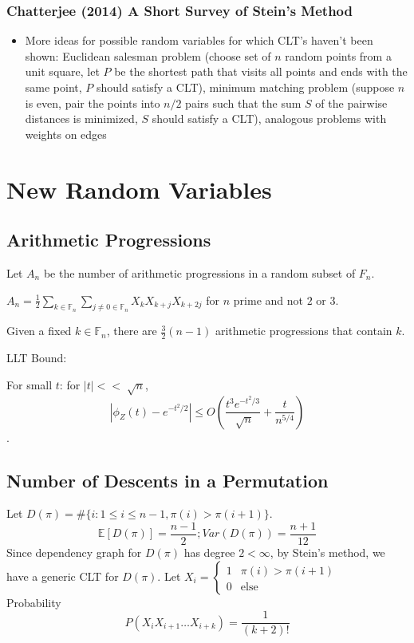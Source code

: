 \documentclass{article}
\newcommand{\lss}{\vspace{5 mm}\noindent}
\newcommand{\f}[2]{\frac{#1}{#2}}
\newcommand{\abs}[1]{\left\lvert#1\right\rvert}
\newcommand{\E}{\mathbb{E}}
\newcommand{\F}{\mathbb{F}}
\theoremstyle{definition}
\theoremstyle{remark}
\begin{document}
\subsubsection{Chatterjee (2014) A Short Survey of Stein's Method}
\begin{itemize}
\item More ideas for possible random variables for which CLT's haven't been shown: Euclidean salesman problem (choose set of $n$ random points from a unit square, let $P$ be the shortest path that visits all points and ends with the same point, $P$ should satisfy a CLT), minimum matching problem (suppose $n$ is even, pair the points into $n/2$ pairs such that the sum $S$ of the pairwise distances is minimized, $S$ should satisfy a CLT), analogous problems with weights on edges
\end{itemize}

\lss
\section{New Random Variables}

\subsection{Arithmetic Progressions}
Let $A_n$ be the number of arithmetic progressions in a random subset of $F_n$.

$A_n = \f{1}{2} \sum_{k \in \F_n} \sum_{j \neq 0 \in \F_n} X_k X_{k+j} X_{k+2j}$ for $n$ prime and not $2$ or $3$.

Given a fixed $k \in \F_n$, there are $\f{3}{2}(n-1)$ arithmetic progressions that contain $k$.

LLT Bound:

For small $t$: for $|t| << \sqrt[]{n}$, \[ \abs{\phi_Z(t) - e^{-t^2/2}} \leq O\left(\frac{t^3e^{-t^2/3}}{\sqrt[]{n}} + \frac{t}{n^{5/4}}\right) \].


\subsection{Number of Descents in a Permutation}
Let $D(\pi) = \#\{i:1\leq i \leq n-1, \pi(i) > \pi(i+1)\}$. 
\[ \E[D(\pi)]  = \frac{n-1}{2}; Var(D(\pi)) = \frac{n+1}{12}\]
Since dependency graph for $D(\pi)$ has degree $2 < \infty$, by Stein's method, we have a generic CLT for $D(\pi)$. 
Let $X_i = 
\begin{cases} 
      1 & \pi(i) > \pi(i+1) \\
      0 & \text{else}
\end{cases}$ \\
Probability \[ P(X_i X_{i+1} \ldots X_{i+k}) = \frac{1}{(k+2)!} \]
\end{document}
